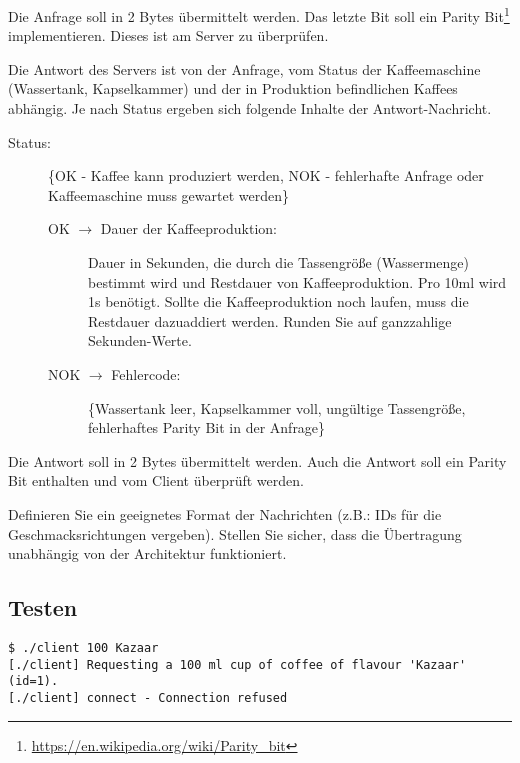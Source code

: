 Die Anfrage soll in 2 Bytes übermittelt werden. Das letzte Bit soll ein Parity
Bit\footnote{\url{https://en.wikipedia.org/wiki/Parity_bit}}
implementieren. Dieses ist am Server zu überprüfen.

Die Antwort des Servers ist von der Anfrage, vom Status der Kaffeemaschine
(Wassertank, Kapselkammer) und der in Produktion befindlichen Kaffees
abhängig. Je nach Status ergeben sich folgende Inhalte der Antwort-Nachricht.
%
\begin{description}
\item[Status:] \{OK - Kaffee kann produziert werden, NOK - fehlerhafte Anfrage
  oder Kaffeemaschine muss gewartet werden\}
  \begin{description}
  \item[OK $\rightarrow$ Dauer der Kaffeeproduktion:] Dauer in Sekunden, die
    durch die Tassengröße (Wassermenge) bestimmt wird und Restdauer von
    Kaffeeproduktion. Pro 10ml wird 1s benötigt. Sollte die Kaffeeproduktion
    noch laufen, muss die Restdauer dazuaddiert werden. Runden Sie auf
    ganzzahlige Sekunden-Werte.
  \item[NOK $\rightarrow$ Fehlercode:] \{Wassertank leer, Kapselkammer voll,
    ungültige Tassengröße, fehlerhaftes Parity Bit in der Anfrage\}
  \end{description}
\end{description}

Die Antwort soll in 2 Bytes übermittelt werden. Auch die Antwort soll ein
Parity Bit enthalten und vom Client überprüft werden.

Definieren Sie ein geeignetes Format der Nachrichten (z.B.: IDs für die
Geschmacksrichtungen vergeben). Stellen Sie sicher, dass die Übertragung
unabhängig von der Architektur funktioniert.

\subsection*{Testen}

\begin{lstlisting}
$ ./client 100 Kazaar
[./client] Requesting a 100 ml cup of coffee of flavour 'Kazaar' (id=1).
[./client] connect - Connection refused
\end{lstlisting}

